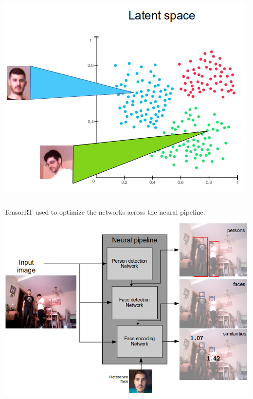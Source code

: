 \documentclass[11pt]{beamer}
\begin{document}
\begin{frame}[allowframebreaks]
\begin{columns}
\begin{center}
			\includegraphics[width=0.6\linewidth]{face_encoder}\\
		\end{center}		
	\end{columns}
	\vspace{8cm}
	TensorRT used to optimize the networks across the neural pipeline.
	\includegraphics[width=0.9\linewidth]{neural_pipeline}
\end{frame}
\end{document}
